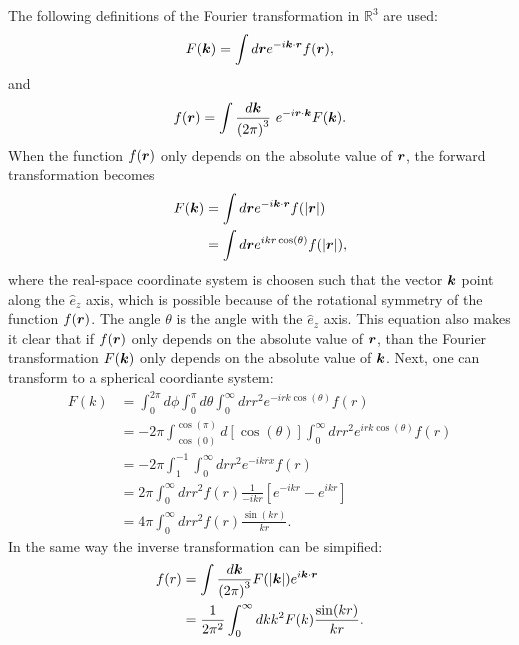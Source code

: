 
The following definitions of the Fourier transformation in
$\mathbb{R}^3$ are used:
\begin{align}
F(\boldsymbol{k}) = \int d \boldsymbol{r} e^{-i \boldsymbol{k} \cdot \boldsymbol{r}} f(\boldsymbol{r}),
\end{align}
and
\begin{align}
f(\boldsymbol{r}) = \int \frac{d\boldsymbol{k}}{\left(2 \pi \right)^3} \ e^{-i \boldsymbol{r} \cdot \boldsymbol{k}} F(\boldsymbol{k}).
\end{align}
When the function $f(\boldsymbol{r})$ only depends on the absolute value
of $\boldsymbol{r}$, the forward transformation becomes
\begin{align}
F(\boldsymbol{k}) &= \int d \boldsymbol{r} e^{-i \boldsymbol{k} \cdot \boldsymbol{r}} f(|\boldsymbol{r}|) \\
&= \int d \boldsymbol{r} e^{i k r \cos(\theta)} f(|\boldsymbol{r}|),
\end{align}
where the real-space coordinate system is choosen such that
the vector $\boldsymbol{k}$ point along the $\hat{e}_z$ axis,
which is possible because of the rotational symmetry of the 
function $f(\boldsymbol{r})$.
The angle $\theta$ is the angle with the $\hat{e}_z$ axis.
This equation also makes it clear that if $f(\boldsymbol{r})$ only depends on the absolute value of $\boldsymbol{r}$,
than the Fourier transformation $F(\boldsymbol{k})$ only depends on the absolute value of $\boldsymbol{k}$.
Next, one can transform to a spherical coordiante system:
\begin{align}
F(k) &= \int_0^{2 \pi} d\phi \int_0^\pi d \theta \int_0^\infty d r
    r^2  e^{-i r k \cos \left( \theta \right)} f(r) \\
&= - 2 \pi \int_{\cos(0)}^{\cos(\pi)} d\left[ \cos(\theta) \right] \int_0^\infty dr r^2 
    e^{i r k \cos \left( \theta \right)} f(r) \\
&= - 2 \pi \int_{1}^{-1} \int_0^\infty dr r^2
    e^{-i krx} f(r) \\
&= 2 \pi \int_0^\infty dr r^2 f(r) \frac{1}{-ikr}
    \left[ e^{-ikr}-e^{ikr} \right] \\
&= 4 \pi \int_0^\infty dr r^2 f(r) \frac{\sin(kr)}{kr}.
\end{align}
In the same way the inverse transformation can be simpified:
\begin{align}
f(r) &= \int \frac{d\boldsymbol{k}}{\left(2 \pi\right)^3} 
F(|\boldsymbol{k}|) e^{i \boldsymbol{k} \cdot \boldsymbol{r}} \\
&= \frac{1}{2 \pi^2} \int_0^\infty dk k^2 F(k)
\frac{\sin(kr)}{kr}.
\end{align}
